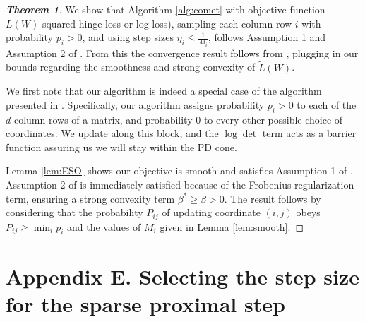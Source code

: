 \documentclass[twoside,11pt]{article}
\newcommand\mat[1]{{#1}}
\newcommand{\W}{\mat{W}}
\newcommand{\Pp}{\mat{P}}
\newcommand{\tL}{\tilde{L}(\W)}
\begin{document}

\begin{proof}[{\bf{Theorem 1}}]
We show that Algorithm \ref{alg:comet} with objective function $\tL$ squared-hinge loss or log loss), sampling each column-row $i$ with probability $p_i >0$, and using step sizes $\eta_i \leq \frac{1}{M_i}$, follows Assumption 1 and Assumption 2 of \citet{richtarik2013optimal}. From this the convergence result follows from \citeauthor[Theorem 3]{richtarik2013optimal}, plugging in our bounds regarding the smoothness and strong convexity of $\tL$.

We first note that our algorithm is indeed a special case of the algorithm presented in \citet{richtarik2013optimal}. Specifically, our algorithm assigns probability $p_i > 0 $ to each of the $d$ column-rows of a matrix, and probability $0$ to every other possible choice of coordinates. We update along this block, and the $\log \det$ term acts as a barrier function
assuring us we will stay within the PD cone.

Lemma \ref{lem:ESO} shows our objective is smooth and satisfies Assumption 1 of \citeauthor{richtarik2013optimal}. Assumption 2 of \citeauthor{richtarik2013optimal} is immediately satisfied because of the Frobenius regularization term, ensuring a strong convexity term $\beta^* \geq \beta > 0$. The result follows by considering that the probability $\Pp_{ij}$ of updating coordinate $(i,j)$ obeys $\Pp_{ij} \geq \min_i p_i $ and the values of $M_i$ given in Lemma \ref{lem:smooth}.

\end{proof}

\section*{Appendix E. Selecting the step size for the sparse proximal step}
\end{document}
